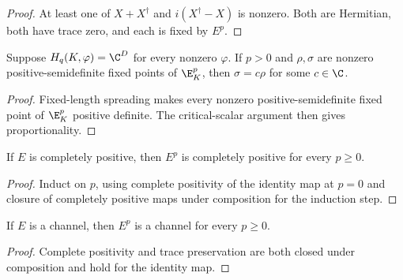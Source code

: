 \begin{proof}\leanok
    At least one of $X+X^\dagger$ and $i(X^\dagger-X)$ is nonzero. Both are
    Hermitian, both have trace zero, and each is fixed by $E^p$.
\end{proof}

\begin{theorem}
    \label{thm:kraus-power-fixed-point-unique-from-spreading}
    \leanok
    Suppose $H_q(K,\varphi)=\C^D$ for every nonzero $\varphi$. If $p>0$ and
    $\rho,\sigma$ are nonzero positive-semidefinite fixed points of
    $\E_K^p$, then $\sigma=c\rho$ for some $c\in\C$.
\end{theorem}

\begin{proof}\leanok
    Fixed-length spreading makes every nonzero positive-semidefinite fixed
    point of $\E_K^p$ positive definite. The critical-scalar argument then
    gives proportionality.
\end{proof}

\begin{theorem}
    \label{thm:cp-map-natural-power}
    \leanok
    If $E$ is completely positive, then $E^p$ is completely positive for every
    $p\geq0$.
\end{theorem}

\begin{proof}\leanok
    Induct on $p$, using complete positivity of the identity map at $p=0$ and
    closure of completely positive maps under composition for the induction
    step.
\end{proof}

\begin{theorem}
    \label{thm:channel-natural-power}
    \leanok
    If $E$ is a channel, then $E^p$ is a channel for every $p\geq0$.
\end{theorem}

\begin{proof}\leanok
    Complete positivity and trace preservation are both closed under
    composition and hold for the identity map.
\end{proof}

